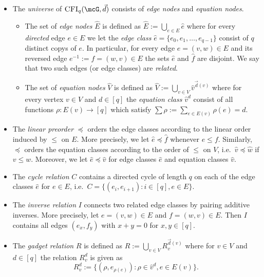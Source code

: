 \documentclass[a4paper,UKenglish]{lipics}
\newcommand{\defeq}{:=}
\newcommand{\inseg}[1]{\ensuremath{[#1]}}
\newcommand{\vct}[1]{\vec{#1}}
\theoremstyle{plain}
\begin{document}
\begin{itemize}
 \item The \emph{universe} of $\CFI(\mcG, \vec d)$ consists of \emph{edge 
nodes} and \emph{equation nodes}.
\begin{itemize}
\item The set of \emph{edge nodes} $\hat{E}$ is defined as $\hat E \defeq
\bigcup_{e \in E} \hat{e}$ where
 for every \emph{directed} edge $e \in E$ we let
 the \emph{edge class} $\hat{e} = \{ e_0, e_1, 
\dots, e_{q-1}\}$ consist of $q$ distinct copys of $e$. 
In particular, for every edge $e = (v,w) \in E$ and its reversed 
edge $e^{-1} \defeq f = (w,v) \in E$ the sets $\hat{e}$ and $\hat{f}$ are 
disjoint. 
We say that two such edges (or edge classes) are \emph{related}. 
\item The set of \emph{equation nodes} $\hat{V}$ is defined as $\hat V \defeq 
\bigcup_{v \in V} \hat{v}^{\vct d(v)}$ where for every 
vertex $v \in V$ and $d \in \inseg q$  the \emph{equation class} 
$\hat{v}^{d}$ 
consist of all functions $\rho: E(v) \to \inseg q$ which satisfy $\sum 
\rho \defeq \sum_{e \in E(v)} \rho(e) = d$.
\end{itemize}


 \item The \emph{linear preorder} $\preceq$ orders the edge 
classes according to the linear order induced by $\leq$ on $E$. More 
precisely, we let $\hat e \preceq \hat f$ whenever $e \leq f$.
Similarly, $\preceq$ orders the equation classes according to the 
order of $\leq$ on $V$, i.e.\ $\hat v \preceq \hat w$ if $v \leq w$. Moreover, 
we let $\hat e \preceq \hat v$ for edge classes $\hat e$ and  
equation classes $\hat v$.

 \item The \emph{cycle relation} $C$ contains a directed 
cycle of length $q$ on each of the edge classes $\hat{e}$ for $e \in 
E$, i.e.\ $C = 
\{ (e_i, e_{i+1}) : i \in \inseg q,  e\in E \}$.
 \item The \emph{inverse relation} $I$ connects two related edge classes 
by pairing additive inverses. More precisely, let 
$e=(v,w)\in E$ and $f = (w,v)\in E$. Then $I$ contains all 
edges $(e_x, f_y)$ with $x + y = 0$ for $x, y \in \inseg q$.

 \item The \emph{gadget relation} $R$  is defined as $R \defeq \bigcup_{v 
\in V} R^{\vct d(v)}_v$ where for $v \in V$ and $d \in \inseg q$ the relation 
$R^{d}_v$ is given as
\[ R^{d}_v \defeq \{ (\rho, e_{\rho(e)}) : \rho \in \hat{v}^{d}, e \in 
E(v) \}.\]
\end{itemize}
\end{document}
